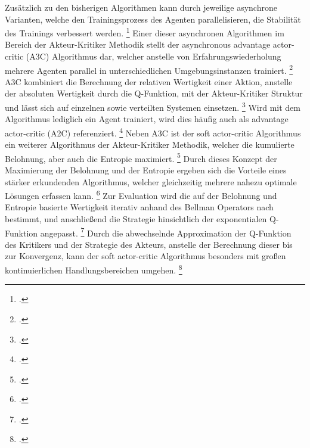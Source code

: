 Zusätzlich zu den bisherigen Algorithmen kann durch jeweilige asynchrone Varianten, welche den Trainingsprozess des Agenten parallelisieren, die Stabilität des Trainings verbessert werden. \footcite[Vgl.][S. 1]{Mnih.2016}
Einer dieser asynchronen Algorithmen im Bereich der Akteur-Kritiker Methodik stellt der asynchronous advantage actor-critic (A3C) Algorithmus dar, welcher anstelle von Erfahrungswiederholung mehrere Agenten parallel in unterschiedlichen Umgebungsinstanzen trainiert. \footcite[Vgl.][S. 1]{Mnih.2016}
A3C kombiniert die Berechnung der relativen Wertigkeit einer Aktion, anstelle der absoluten Wertigkeit durch die Q-Funktion, mit der Akteur-Kritiker Struktur und lässt sich auf einzelnen sowie verteilten Systemen einsetzen. \footcite[Vgl.][S. 9]{Arulkumaran.2017} 
Wird mit dem Algorithmus lediglich ein Agent trainiert, wird dies häufig auch als advantage actor-critic (A2C) referenziert. \footcite[Vgl.][S. 9]{Arulkumaran.2017} 
Neben A3C ist der soft actor-critic Algorithmus ein weiterer Algorithmus der Akteur-Kritiker Methodik, welcher die kumulierte Belohnung, aber auch die Entropie maximiert. \footcite[Vgl.][S. 1]{Haarnoja.2018}
Durch dieses Konzept der Maximierung der Belohnung und der Entropie ergeben sich die Vorteile eines stärker erkundenden Algorithmus, welcher gleichzeitig mehrere nahezu optimale Lösungen erfassen kann. \footcite[Vgl.][S. 3]{Haarnoja.2018}
Zur Evaluation wird die auf der Belohnung und Entropie basierte Wertigkeit iterativ anhand des Bellman Operators nach \cite[]{Bellman.1966} bestimmt, und anschließend die Strategie hinsichtlich der exponentialen Q-Funktion angepasst. \footcite[Vgl.][S. 4]{Haarnoja.2018}
Durch die abwechselnde Approximation der Q-Funktion des Kritikers und der Strategie des Akteurs, anstelle der Berechnung dieser bis zur Konvergenz, kann der soft actor-critic Algorithmus besonders mit großen kontinuierlichen Handlungsbereichen umgehen. \footcite[Vgl.][S. 4]{Haarnoja.2018}


